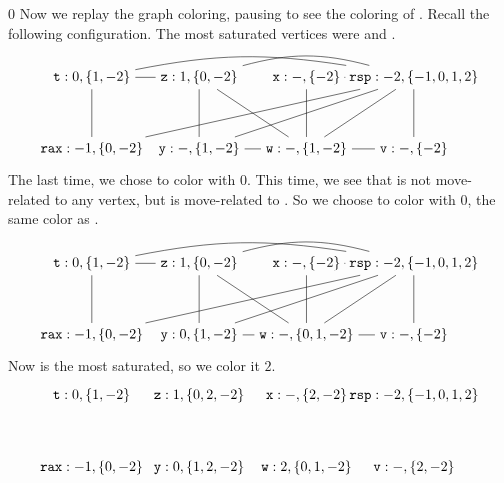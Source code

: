 \documentclass[7x10]{TimesAPriori_MIT}%
\def\racketEd{0}
\def\edition{1}
\numberwithin{theorem}{chapter}
\numberwithin{definition}{chapter}
\numberwithin{equation}{chapter}
\begin{document}
{\if\edition\racketEd
Now we replay the graph coloring, pausing to see the coloring of
. Recall the following configuration. The most saturated vertices
were  and .
\[
\begin{tikzpicture}[baseline=(current  bounding  box.center),scale=0.9]
\node (rax) at (0,0) {$\ttm{rax}:-1,\{0,-2\}$};
\node (rsp) at (9,2) {$\ttm{rsp}:-2,\{-1,0,1,2\}$};
\node (t1) at (0,2) {$\ttm{t}:0,\{1,-2\}$};
\node (z) at (3,2)  {$\ttm{z}:1,\{0,-2\}$};
\node (x) at (6,2)  {$\ttm{x}:-,\{-2\}$};
\node (y) at (3,0)  {$\ttm{y}:-,\{1,-2\}$};
\node (w) at (6,0)  {$\ttm{w}:-,\{1,-2\}$};
\node (v) at (9,0)  {$\ttm{v}:-,\{-2\}$};

\draw (t1) to (rax);
\draw (t1) to (z);
\draw (z) to (y);
\draw (z) to (w);
\draw (x) to (w);
\draw (y) to (w);
\draw (v) to (w);

\draw (v) to (rsp);
\draw (w) to (rsp);
\draw (x) to (rsp);
\draw (y) to (rsp);
\path[-.,bend left=15] (z) edge node {} (rsp);
\path[-.,bend left=10] (t1) edge node {} (rsp);
\draw (rax) to (rsp);
\end{tikzpicture}
\]
%
The last time, we chose to color  with $0$. This time, we see
that  is not move-related to any vertex, but  is
move-related to .  So we choose to color  with $0$,
the same color as .
\[
\begin{tikzpicture}[baseline=(current  bounding  box.center),scale=0.9]
\node (rax) at (0,0) {$\ttm{rax}:-1,\{0,-2\}$};
\node (rsp) at (9,2) {$\ttm{rsp}:-2,\{-1,0,1,2\}$};
\node (t1) at (0,2) {$\ttm{t}:0,\{1,-2\}$};
\node (z) at (3,2)  {$\ttm{z}:1,\{0,-2\}$};
\node (x) at (6,2)  {$\ttm{x}:-,\{-2\}$};
\node (y) at (3,0)  {$\ttm{y}:0,\{1,-2\}$};
\node (w) at (6,0)  {$\ttm{w}:-,\{0,1,-2\}$};
\node (v) at (9,0)  {$\ttm{v}:-,\{-2\}$};

\draw (t1) to (rax);
\draw (t1) to (z);
\draw (z) to (y);
\draw (z) to (w);
\draw (x) to (w);
\draw (y) to (w);
\draw (v) to (w);

\draw (v) to (rsp);
\draw (w) to (rsp);
\draw (x) to (rsp);
\draw (y) to (rsp);
\path[-.,bend left=15] (z) edge node {} (rsp);
\path[-.,bend left=10] (t1) edge node {} (rsp);
\draw (rax) to (rsp);
\end{tikzpicture}
\]
Now  is the most saturated, so we color it $2$.
\[
\begin{tikzpicture}[baseline=(current  bounding  box.center),scale=0.9]
\node (rax) at (0,0) {$\ttm{rax}:-1,\{0,-2\}$};
\node (rsp) at (9,2) {$\ttm{rsp}:-2,\{-1,0,1,2\}$};
\node (t1) at (0,2) {$\ttm{t}:0,\{1,-2\}$};
\node (z) at (3,2)  {$\ttm{z}:1,\{0,2,-2\}$};
\node (x) at (6,2)  {$\ttm{x}:-,\{2,-2\}$};
\node (y) at (3,0)  {$\ttm{y}:0,\{1,2,-2\}$};
\node (w) at (6,0)  {$\ttm{w}:2,\{0,1,-2\}$};
\node (v) at (9,0)  {$\ttm{v}:-,\{2,-2\}$};


\end{tikzpicture}\]}
\end{document}
